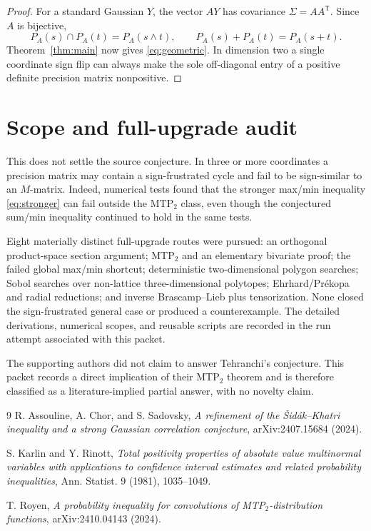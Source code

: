 \documentclass[11pt]{article}
\begin{document}
\begin{proof}
For a standard Gaussian $Y$, the vector $AY$ has covariance
$\Sigma=AA^{\mathsf T}$.  Since $A$ is bijective,
\[
 P_A(s)\cap P_A(t)=P_A(s\wedge t),\qquad
 P_A(s)+P_A(t)=P_A(s+t).
\]
Theorem~\ref{thm:main} now gives \eqref{eq:geometric}.  In dimension two a
single coordinate sign flip can always make the sole off-diagonal entry of a
positive definite precision matrix nonpositive.
\end{proof}

\section{Scope and full-upgrade audit}

This does not settle the source conjecture.  In three or more coordinates a
precision matrix may contain a sign-frustrated cycle and fail to be
sign-similar to an $M$-matrix.  Indeed, numerical tests found that the stronger
max/min inequality \eqref{eq:stronger} can fail outside the MTP$_2$ class,
even though the conjectured sum/min inequality continued to hold in the same
tests.

Eight materially distinct full-upgrade routes were pursued: an orthogonal
product-space section argument; MTP$_2$ and an elementary bivariate proof;
the failed global max/min shortcut; deterministic two-dimensional polygon
searches; Sobol searches over non-lattice three-dimensional polytopes;
Ehrhard/Pr\'ekopa and radial reductions; and inverse Brascamp--Lieb plus
tensorization.  None closed the sign-frustrated general case or produced a
counterexample.  The detailed derivations, numerical scopes, and reusable
scripts are recorded in the run attempt associated with this packet.

The supporting authors did not claim to answer Tehranchi's conjecture.  This
packet records a direct implication of their MTP$_2$ theorem and is therefore
classified as a literature-implied partial answer, with no novelty claim.

\begingroup\raggedright
\begin{thebibliography}{9}
R. Assouline, A. Chor, and S. Sadovsky,
\emph{A refinement of the \v{S}id\'ak--Khatri inequality and a strong Gaussian
correlation conjecture}, arXiv:2407.15684 (2024).

S. Karlin and Y. Rinott,
\emph{Total positivity properties of absolute value multinormal variables
with applications to confidence interval estimates and related probability
inequalities}, Ann. Statist. 9 (1981), 1035--1049.

T. Royen,
\emph{A probability inequality for convolutions of MTP$_2$-distribution
functions}, arXiv:2410.04143 (2024).
\end{thebibliography}
\endgroup
\end{document}
